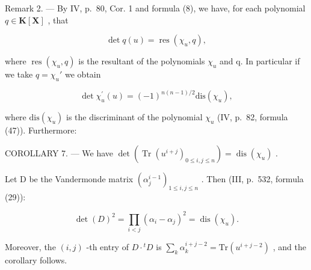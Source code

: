Remark 2. --- By IV, p.~80, Cor. 1 and formula (8), we have, for each polynomial \(q \in \mathbf{K}[\mathbf{X}]\) , that

\[
\det q (u) = \operatorname{res} \left(\chi_ {u}, q\right),\tag{9}
\]

where \(\operatorname{res}(\chi_{u}, q)\) is the resultant of the polynomials \(\chi_{u}\) and q. In particular if we take \(q = \chi_{u}'\) we obtain

\[
\det \chi_ {u} ^ {\prime} (u) = (- 1) ^ {n (n - 1) / 2} \mathrm{dis} (\chi_ {u}),\tag{10}
\]

where \(\mathrm{dis}(\chi_{u})\) is the discriminant of the polynomial \(\chi_{u}\) (IV, p.~82, formula (47)). Furthermore:

COROLLARY 7. --- We have \(\det\left(\operatorname{Tr}\left(u^{i+j}\right)_{0\leqslant i,j\leqslant n}\right)=\operatorname{dis}\left(\chi_{u}\right)\) .

Let D be the Vandermonde matrix \((\alpha_j^{i-1})_{1 \leqslant i, j \leqslant n}\) . Then (III, p.~532, formula (29)):

\[
\det (D) ^ {2} = \prod_ {i <   j} (\alpha_ {i} - \alpha_ {j}) ^ {2} = \operatorname{dis} (\chi_ {u}).
\]

Moreover, the \((i,j)\) -th entry of \(D\cdot {}^t D\) is \(\sum_{k}\alpha_{k}^{i + j - 2} = \mathrm{Tr}(u^{i + j - 2})\) , and the corollary follows.

